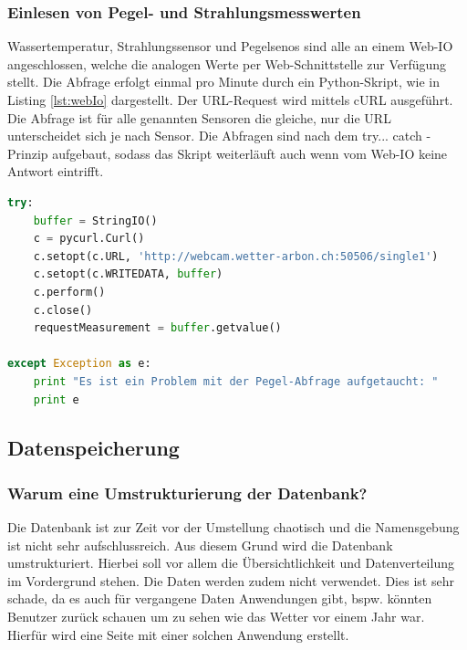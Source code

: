 \subsubsection{Einlesen von Pegel- und Strahlungsmesswerten}
Wassertemperatur, Strahlungssensor und Pegelsenos sind alle an einem Web-IO angeschlossen, welche die analogen Werte per Web-Schnittstelle zur Verfügung stellt. Die Abfrage erfolgt einmal pro Minute durch ein Python-Skript, wie in Listing \ref{lst:webIo} dargestellt. Der URL-Request wird mittels cURL ausgeführt. Die Abfrage ist für alle genannten Sensoren die gleiche, nur die URL unterscheidet sich je nach Sensor. Die Abfragen sind nach dem try... catch - Prinzip aufgebaut, sodass das Skript weiterläuft auch wenn vom Web-IO keine Antwort eintrifft.

\begin{lstlisting}[label=lst:webIo,caption=Web-Abfrage des Pegel-Messwerts, language=python, style=py]
try:
    buffer = StringIO()
    c = pycurl.Curl()
    c.setopt(c.URL, 'http://webcam.wetter-arbon.ch:50506/single1')
    c.setopt(c.WRITEDATA, buffer)
    c.perform()
    c.close()
    requestMeasurement = buffer.getvalue()

except Exception as e:
    print "Es ist ein Problem mit der Pegel-Abfrage aufgetaucht: "
    print e
\end{lstlisting}


\subsection{Datenspeicherung}
\subsubsection{Warum eine Umstrukturierung der Datenbank?}
Die Datenbank ist zur Zeit vor der Umstellung chaotisch und die Namensgebung ist nicht sehr aufschlussreich. Aus diesem Grund wird die Datenbank umstrukturiert. Hierbei soll vor allem die Übersichtlichkeit und Datenverteilung im Vordergrund stehen. Die Daten werden zudem nicht verwendet. Dies ist sehr schade, da es auch für vergangene Daten Anwendungen gibt, bspw. könnten Benutzer zurück schauen um zu sehen wie das Wetter vor einem Jahr war. Hierfür wird eine Seite mit einer solchen Anwendung erstellt.

